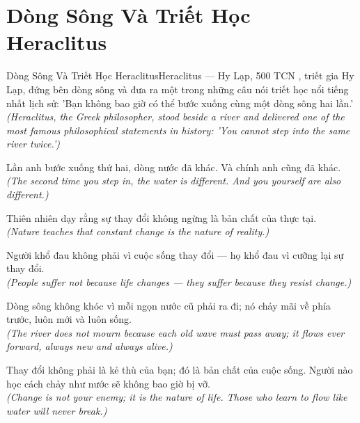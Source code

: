 \section{Dòng Sông Và Triết Học Heraclitus}
\begin{truyen}{Dòng Sông Và Triết Học Heraclitus}{Heraclitus --- Hy Lạp, 500 TCN}
, triết gia Hy Lạp, đứng bên dòng sông và đưa ra một trong những câu nói triết học nổi tiếng nhất lịch sử: 'Bạn không bao giờ có thể bước xuống cùng một dòng sông hai lần.'\\[4pt]
\textit{(Heraclitus, the Greek philosopher, stood beside a river and delivered one of the most famous philosophical statements in history: 'You cannot step into the same river twice.')}

Lần anh bước xuống thứ hai, dòng nước đã khác. Và chính anh cũng đã khác.\\[4pt]
\textit{(The second time you step in, the water is different. And you yourself are also different.)}

Thiên nhiên dạy rằng sự thay đổi không ngừng là bản chất của thực tại.\\[4pt]
\textit{(Nature teaches that constant change is the nature of reality.)}

Người khổ đau không phải vì cuộc sống thay đổi --- họ khổ đau vì cưỡng lại sự thay đổi.\\[4pt]
\textit{(People suffer not because life changes --- they suffer because they resist change.)}

Dòng sông không khóc vì mỗi ngọn nước cũ phải ra đi; nó chảy mãi về phía trước, luôn mới và luôn sống.\\[4pt]
\textit{(The river does not mourn because each old wave must pass away; it flows ever forward, always new and always alive.)}

\end{truyen}
\begin{baihoc}
  Thay đổi không phải là kẻ thù của bạn; đó là bản chất của cuộc sống. Người nào học cách chảy như nước sẽ không bao giờ bị vỡ.\\[4pt]
  \textit{(Change is not your enemy; it is the nature of life. Those who learn to flow like water will never break.)}
\end{baihoc}

